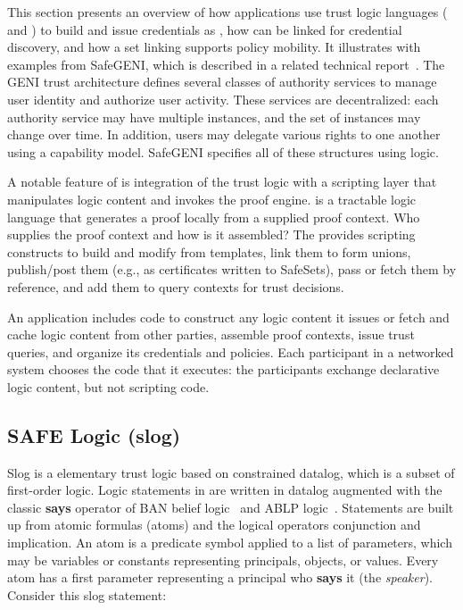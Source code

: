 This section presents an overview of how  applications use trust
logic languages ( and ) to build and issue
credentials as , how  can be linked for
credential discovery, and how a set linking supports policy mobility.  It
illustrates with examples from SafeGENI, which is described in a related
technical report~\cite{chase14:safegeni}.  The GENI trust architecture defines
several classes of authority services to manage user identity and authorize
user activity. These services are decentralized: each authority service may
have multiple instances, and the set of instances may change over time.  In
addition, users may delegate various rights to one another using a capability
model. SafeGENI specifies all of these structures using logic.

A notable feature of  is integration of the trust logic with a
scripting layer that manipulates logic content and invokes the proof engine.
 is a tractable logic language that generates a proof locally
from a supplied proof context. Who supplies the proof context and how is it
assembled? The  provides scripting constructs to build and
modify  from templates, link them to form unions, publish/post them
(e.g., as certificates written to SafeSets), pass or fetch them by reference,
and add them to query contexts for trust decisions.

An application includes  code to construct any logic content it
issues or fetch and cache logic content from other parties, assemble proof
contexts, issue trust queries, and organize its credentials and policies.  Each
participant in a networked system chooses the  code that it
executes: the participants exchange declarative logic content, but not
scripting code. 

\subsection{SAFE Logic (slog)}
\label{sec:slog}

Slog is a elementary trust logic based on constrained datalog, which is a
subset of first-order logic. Logic statements in  are written in
datalog augmented with the classic {\bf says} operator of BAN belief
logic~\cite{Burrows:1990} and ABLP logic~\cite{lampson92:authentication}.
Statements are built up from atomic formulas (atoms) and the logical operators
conjunction and implication.  An atom is a predicate symbol applied to a list
of parameters, which may be variables or constants representing principals,
objects, or values. Every atom has a first parameter representing a principal
who {\bf says} it (the {\it speaker}). Consider this slog statement:


